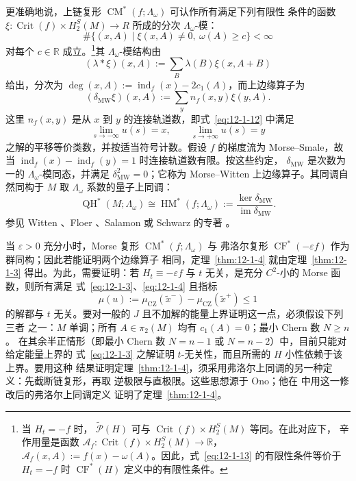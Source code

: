 更准确地说，上链复形 $\operatorname{CM}^*(f;\Lambda_\omega)$ 可认作所有满足下列有限性
条件的函数 $\xi:\operatorname{Crit}(f)\times H_2^S(M)\to R$ 所成的分次
$\Lambda_\omega$-模：
\begin{equation}\label{eq:12-1-13}
  \#\{(x,A)\mid \xi(x,A)\neq0,\ \omega(A)\geq c\}<\infty
\end{equation}
对每个 $c\in\mathbb R$ 成立。\footnote{当 $H_t=-f$ 时，
$\widetilde{\mathcal P}(H)$ 可与 $\operatorname{Crit}(f)\times H_2^S(M)$ 等同。在此对应下，
辛作用量是函数 $\mathcal A_f:\operatorname{Crit}(f)\times H_2^S(M)\to\mathbb R$，
$\mathcal A_f(x,A):=f(x)-\omega(A)$。因此，式~\eqref{eq:12-1-13} 的有限性条件等价于
$H_t=-f$ 时 $\operatorname{CF}^*(H)$ 定义中的有限性条件。}其 $\Lambda_\omega$-模结构由
\[
  (\lambda*\xi)(x,A):=\sum_B\lambda(B)\xi(x,A+B)
\]
给出，分次为 $\deg(x,A):=\operatorname{ind}_f(x)-2c_1(A)$，而上边缘算子为
\[
  (\delta_{\mathrm{MW}}\xi)(x,A):=\sum_y n_f(x,y)\xi(y,A).
\]
这里 $n_f(x,y)$ 是从 $x$ 到 $y$ 的连接轨道数，即式~\eqref{eq:12-1-12} 中满足
\[
  \lim_{s\to-\infty}u(s)=x,\qquad \lim_{s\to+\infty}u(s)=y
\]
之解的平移等价类数，并按适当符号计数。假设 $f$ 的梯度流为 Morse--Smale，故当
$\operatorname{ind}_f(x)-\operatorname{ind}_f(y)=1$ 时连接轨道数有限。按这些约定，
$\delta_{\mathrm{MW}}$ 是次数为一的 $\Lambda_\omega$-模同态，并满足
$\delta_{\mathrm{MW}}^2=0$；它称为 Morse--Witten 上边缘算子。其同调自然同构于 $M$
取 $\Lambda_\omega$ 系数的量子上同调：
\[
  \operatorname{QH}^*(M;\Lambda_\omega)
  \cong\operatorname{HM}^*(f;\Lambda_\omega)
  :=\frac{\ker\delta_{\mathrm{MW}}}{\operatorname{im}\delta_{\mathrm{MW}}}.
\]
参见 Witten 、Floer 、Salamon  或 Schwarz 的专著
。

当 $\varepsilon>0$ 充分小时，Morse 复形 $\operatorname{CM}^*(f;\Lambda_\omega)$ 与
弗洛尔复形 $\operatorname{CF}^*(-\varepsilon f)$ 作为群同构；因此若能证明两个边缘算子
相同，定理~\ref{thm:12-1-4} 就由定理~\ref{thm:12-1-3} 得出。为此，需要证明：若
$H_t\equiv-\varepsilon f$ 与 $t$ 无关，是充分 $C^2$-小的 Morse 函数，则所有满足
式~\eqref{eq:12-1-3}、\eqref{eq:12-1-4} 且指标
\[
  \mu(u):=\mu_{\mathrm{CZ}}(\widetilde x^-)-\mu_{\mathrm{CZ}}(\widetilde x^+)\leq1
\]
的解都与 $t$ 无关。要对一般的 $J$ 且不加解的能量上界证明这一点，必须假设下列三者
之一：$M$ 单调；所有 $A\in\pi_2(M)$ 均有 $c_1(A)=0$；最小 Chern 数 $N\geq n$。
在其余半正情形（即最小 Chern 数 $N=n-1$ 或 $N=n-2$）中，目前只能对给定能量上界的
式~\eqref{eq:12-1-3} 之解证明 $t$-无关性，而且所需的 $H$ 小性依赖于该上界。要用这种
结果证明定理~\ref{thm:12-1-4}，须采用弗洛尔上同调的另一种定义：先截断链复形，再取
逆极限与直极限。这些思想源于 Ono；他在  中用这一修改后的弗洛尔上同调定义
证明了定理~\ref{thm:12-1-4}。

